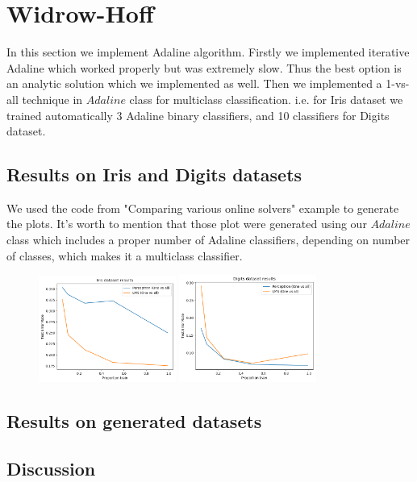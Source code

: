 \documentclass[12pt]{article}
\begin{document}
\newpage
\section{Widrow-Hoff}
In this section we implement Adaline algorithm. Firstly we implemented iterative Adaline which worked properly but was extremely slow. Thus the best option is an analytic solution which we implemented as well. Then we implemented a 1-vs-all technique in $Adaline$ class for multiclass classification. i.e. for Iris dataset we trained automatically 3 Adaline binary classifiers, and 10 classifiers for Digits dataset.
\subsection{Results on Iris and Digits datasets}
We used the code from "Comparing various online solvers" example to generate the plots. It's worth to mention that those plot were generated using our $Adaline$ class which includes a proper number of Adaline classifiers, depending on number of classes, which makes it a multiclass classifier. 
\begin{figure}[ht]
	\centering
	\includegraphics[width=0.4\textwidth]{weirdo_hoff_plots/iris}
	\includegraphics[width=0.4\textwidth]{weirdo_hoff_plots/digits}			
\end{figure}

\subsection{Results on generated datasets}
\subsection{Discussion}
\end{document}
